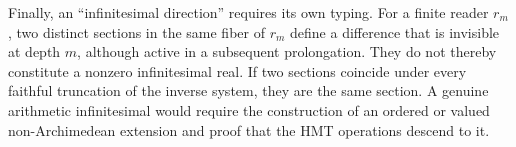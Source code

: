 Finally, an ``infinitesimal direction'' requires its own typing. For a finite reader \(r_m\), two distinct sections in the same fiber of \(r_m\) define a difference that is invisible at depth \(m\), although active in a subsequent prolongation. They do not thereby constitute a nonzero infinitesimal real. If two sections coincide under every faithful truncation of the inverse system, they are the same section. A genuine arithmetic infinitesimal would require the construction of an ordered or valued non-Archimedean extension and proof that the HMT operations descend to it.
